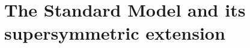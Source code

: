 \documentclass[
twoside=true,
headsepline,     %
headings=normal,
open=right,
numbers=noenddot, %
a4paper,
11pt
]{scrreprt} %
\begin{document}
% 
% 
% 
% 
% 
\tableofcontents \cleardoublepage


\setcounter{page}{1}
% 
 
\part{The Standard Model and its supersymmetric extension} \label{part:Theory}


% 
\end{document}
